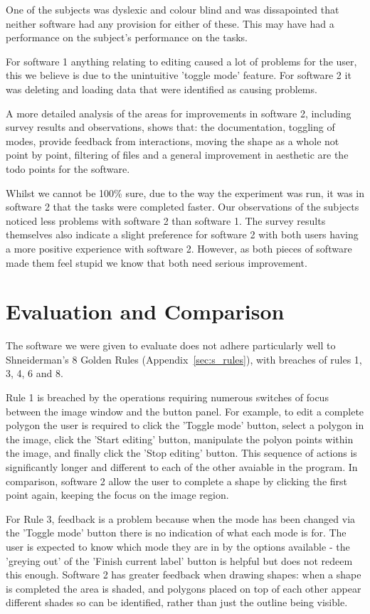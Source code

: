 \documentclass[a4paper,11pt,oneside]{article}
\begin{document}
One of the subjects was dyslexic and colour blind and was dissapointed that neither software had any provision for either of these.  This may have had a performance on the subject's performance on the tasks.

For software 1 anything relating to editing caused a lot of problems for the user, this we believe is due to the unintuitive 'toggle mode' feature.  For software 2 it was deleting and loading data that were identified as causing problems.

A more detailed analysis of the areas for improvements in software 2, including survey results and observations, shows that: the documentation, toggling of modes, provide feedback from interactions, moving the shape as a whole not point by point, filtering of files and a general improvement in aesthetic are the todo points for the software.

Whilst we cannot be 100\% sure, due to the way the experiment was run, it was in software 2 that the tasks were completed faster.  Our observations of the subjects noticed less problems with software 2 than software 1.  The survey results themselves also indicate a slight preference for software 2 with both users having a more positive experience with software 2. However, as both pieces of software made them feel stupid we know that both need serious improvement.

\section{Evaluation and Comparison}

The software we were given to evaluate does not adhere particularly well to Shneiderman's 8 Golden Rules (Appendix~\ref{sec:s_rules}), with breaches of rules 1, 3, 4, 6 and 8. 

Rule 1 is breached by the operations requiring numerous switches of focus between the image window and the button panel. For example, to edit a complete polygon the user is required to click the 'Toggle mode' button, select a polygon in the image, click the 'Start editing' button, manipulate the polyon points within the image, and finally click the 'Stop editing' button. This sequence of actions is significantly longer and different to each of the other avaiable in the program. In comparison, software 2 allow the user to complete a shape by clicking the first point again, keeping the focus on the image region.

For Rule 3, feedback is a problem because when the mode has been changed via the 'Toggle mode' button there is no indication of what each mode is for. The user is expected to know which mode they are in by the options available - the 'greying out' of the 'Finish current label' button is helpful but does not redeem this enough. Software 2 has greater feedback when drawing shapes: when a shape is completed the area is shaded, and polygons placed on top of each other appear different shades so can be identified, rather than just the outline being visible.
\end{document}
